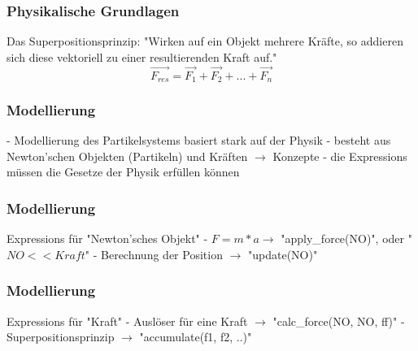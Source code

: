 \documentclass{beamer}
\begin{document}
\begin{frame}
\frametitle{Physikalische Grundlagen}
Das Superpositionsprinzip: \linebreak
\linebreak
"Wirken auf ein Objekt mehrere Kräfte, so addieren sich diese vektoriell zu einer resultierenden Kraft auf."
\linebreak
\begin{equation}
\overrightarrow{F_{res}} = \overrightarrow{F_1} + \overrightarrow{F_2} +...+ \overrightarrow{F_n}
\end{equation}
\end{frame}

\begin{frame}
\frametitle{Modellierung}
- Modellierung des Partikelsystems basiert stark auf der Physik \linebreak
\linebreak
- besteht aus Newton'schen Objekten (Partikeln) und Kr\"aften \linebreak
$\rightarrow$ Konzepte \linebreak
\linebreak
- die Expressions m\"ussen die Gesetze der Physik erf\"ullen k\"onnen
\end{frame}


\begin{frame}
\frametitle{Modellierung}

Expressions f\"ur "Newton'sches Objekt" \linebreak
\linebreak
- $F=m*a \rightarrow$  "apply\_force(NO)", oder "$NO << Kraft$" \linebreak
\linebreak
- Berechnung der Position $\rightarrow$ "update(NO)"
\end{frame}

\begin{frame}
\frametitle{Modellierung}

Expressions f\"ur "Kraft" \linebreak
\linebreak
- Ausl\"oser f\"ur eine Kraft $\rightarrow$ "calc\_force(NO, NO, ff)" \linebreak
\linebreak
- Superpositionsprinzip $\rightarrow$ "accumulate(f1, f2, ..)"
\end{frame}
\end{document}
